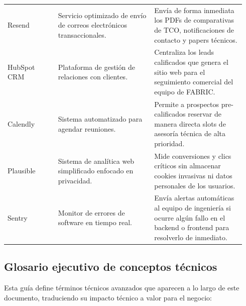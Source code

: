 \documentclass[11pt,letterpaper]{article}
\begin{document}
\begin{longtable}{p{0.20\linewidth}p{0.38\linewidth}p{0.36\linewidth}}
Resend & Servicio optimizado de envío de correos electrónicos transaccionales. & Envía de forma inmediata los PDFs de comparativas de TCO, notificaciones de contacto y papers técnicos. \\
HubSpot CRM & Plataforma de gestión de relaciones con clientes. & Centraliza los leads calificados que genera el sitio web para el seguimiento comercial del equipo de FABRIC. \\
Calendly & Sistema automatizado para agendar reuniones. & Permite a prospectos pre-calificados reservar de manera directa slots de asesoría técnica de alta prioridad. \\
Plausible & Sistema de analítica web simplificado enfocado en privacidad. & Mide conversiones y clics críticos sin almacenar cookies invasivas ni datos personales de los usuarios. \\
Sentry & Monitor de errores de software en tiempo real. & Envía alertas automáticas al equipo de ingeniería si ocurre algún fallo en el backend o frontend para resolverlo de inmediato. \\
\bottomrule
\end{longtable}

\subsection{Glosario ejecutivo de conceptos técnicos}

Esta guía define términos técnicos avanzados que aparecen a lo largo de este documento, traduciendo su impacto técnico a valor para el negocio:
\end{document}
